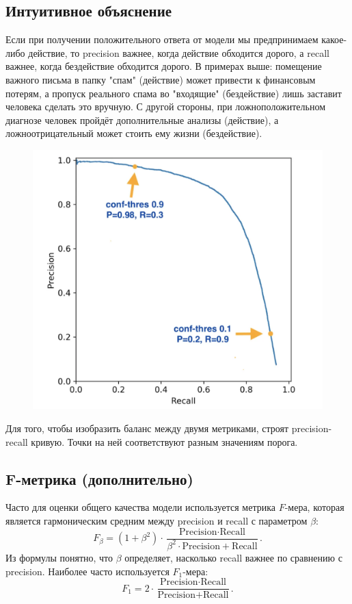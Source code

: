\subsection*{Интуитивное объяснение}

Если при получении положительного ответа от модели мы предпринимаем какое-либо действие, то precision важнее, когда действие обходится дорого, а recall важнее, когда бездействие обходится дорого. В примерах выше: помещение важного письма в папку "спам" (действие) может привести к финансовым потерям, а пропуск реального спама во "входящие" (бездействие) лишь заставит человека сделать это вручную. С другой стороны, при ложноположительном диагнозе человек пройдёт дополнительные анализы (действие), а ложноотрицательный может стоить ему жизни (бездействие).

\begin{figure}[ht!]
    \centering
    \includegraphics[width=0.65\linewidth]{chapters/model_selection/images/Precisionrecallcurve.png}
\end{figure}

\bigskip
\bigskip

Для того, чтобы изобразить баланс между двумя метриками, строят precision-recall кривую. Точки на ней соответствуют разным значениям порога.

\subsection*{F-метрика (дополнительно)}

Часто для оценки общего качества модели используется метрика $F$-мера, которая является гармоническим средним между precision и recall с параметром $\beta$:
\[
    F_{\beta} = (1 + \beta^2) \cdot \frac{\text{Precision} \cdot \text{Recall}}{\beta^2 \cdot \text{Precision} + \text{Recall}}.
\]
Из формулы понятно, что $\beta$ определяет, насколько recall важнее по сравнению с precision. Наиболее часто используется $F_1$-мера:
\[
    F_1 = 2 \cdot \frac{\text{Precision} \cdot \text{Recall}}{\text{Precision} + \text{Recall}}.
\]

